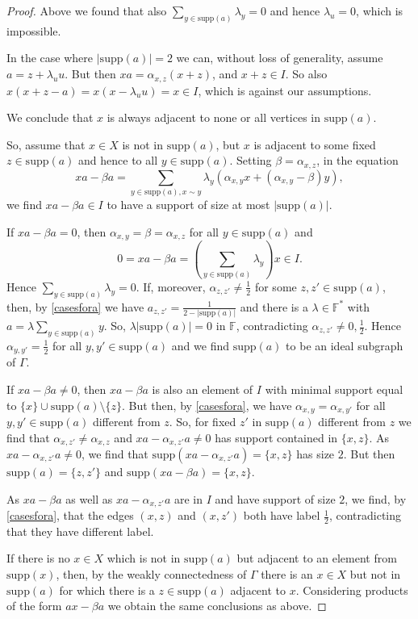 \documentclass[10pt,a4paper]{amsart}
\begin{document}
\begin{proof}
Above we found that also $\displaystyle\sum_{y\in \mathrm{supp}(a)} \lambda_y=0$
and hence $\lambda_u=0$, which is impossible.


In the case where $|\mathrm{supp}(a)|=2$ we can, without loss of generality, assume $a=z+\lambda_u u$.
But then $xa= \alpha_{x,z}(x+z)$, and $x+z\in I$.
So also $x(x+z-a)= x(x-\lambda_u u)=x\in I$, which is against our assumptions.

We conclude that $x$ is always adjacent to none or all vertices in $\mathrm{supp}(a)$. 



So, assume that $x\in X$ is not in $\mathrm{supp}(a)$, but $x$ is adjacent to some fixed $z\in\mathrm{supp}(a)$
and hence to all $y\in \mathrm{supp}(a)$.
Setting  $\beta=\alpha_{x,z}$,  in the equation
$$ xa-\beta a=\displaystyle\sum_{y\in \mathrm{supp}(a),x\sim y} \lambda_y(\alpha_{x,y} x +(\alpha_{x,y}-\beta) y),$$ 
we find $xa-\beta a\in I$ to have a support of size at most 
$|\mathrm{supp}(a)|$.

If $xa-\beta a=0$, then $\alpha_{x,y}=\beta=\alpha_{x,z}$ for all $y\in \mathrm{supp}(a)$
and $$0=xa-\beta a=(\displaystyle\sum_{y\in \mathrm{supp}(a)}\lambda_y) x\in I.$$
Hence $\displaystyle\sum_{y\in \mathrm{supp}(a)}\lambda_y=0$.
If, moreover, $\alpha_{z,z'}\neq \frac{1}{2}$ for some $z,z'\in \mathrm{supp}(a)$, then, by \cref{casesfora} we have $a_{z,z'}=\frac{1}{2-|\mathrm{supp}(a)|}$ and 
there is a $\lambda\in \mathbb{F}^*$ with $a=\lambda \displaystyle\sum_{y\in \mathrm{supp}(a)} y$.
So, $\lambda |\mathrm{supp}(a)|=0$ in $\mathbb{F}$, contradicting $\alpha_{z,z'}\neq 0, \frac{1}{2}$.
Hence $\alpha_{y,y'}=\frac{1}{2}$ for all $y,y'\in \mathrm{supp}(a)$ and we find $\mathrm{supp}(a)$ to be an ideal subgraph of $\Gamma$.


If $xa-\beta a\neq 0$, then $xa-\beta a$ is also an element of $I$ with minimal support equal to $\{x\}\cup \mathrm{supp}(a)\setminus \{z\}$.
But then, by \cref{casesfora}, we have  $\alpha_{x,y}=\alpha_{x,y'}$ for all $y,y'\in \mathrm{supp}(a)$ different from $z$. 
So, for fixed $z'$ in $\mathrm{supp}(a)$ different from $z$ we find that $\alpha_{x,z'}\neq \alpha_{x,z}$ and   $xa-\alpha_{x,z'}a\neq 0$ has support contained in $\{x,z\}$.
As $xa-\alpha_{x,z'}a\neq 0$, we find that $\mathrm{supp}(xa-\alpha_{x,z'}a)=\{x,z\}$ has size $2$. But then $\mathrm{supp}(a)=\{z,z'\}$ and 
$\mathrm{supp}(xa-\beta a)=\{x,z\}$.

As $xa-\beta a$ as well as $xa-\alpha_{x,z'}a$ are in $I$ and have support of size $2$, we find, by \cref{casesfora}, that the edges $(x,z)$ and $(x,z')$ both have label $\frac{1}{2}$, contradicting that they have different label.

If there is no $x\in X$  which is not in $\mathrm{supp}(a)$ but  adjacent to an element from $\mathrm{supp}(x)$, then, by the weakly connectedness
of $\Gamma$ there is an $x\in X$ but not in $\mathrm{supp}(a)$ for which there is a $z\in \mathrm{supp}(a)$ adjacent to $x$.
Considering products of the form $ax-\beta a$ we obtain the same conclusions as above.
\end{proof}
\end{document}
